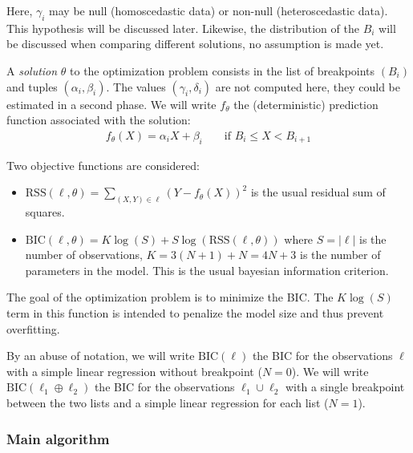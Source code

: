                 Here, \(\gamma_i\) may be null (homoscedastic data) or non-null (heteroscedastic data). This hypothesis
                will be discussed later. Likewise, the distribution of the \(B_i\) will be discussed when comparing
                different solutions, no assumption is made yet.

                A \emph{solution} \(\theta\) to the optimization problem consists in the list of breakpoints \((B_i)\)
                and tuples \((\alpha_i,\beta_i)\). The values \((\gamma_i, \delta_i)\) are not computed here, they could
                be estimated in a second phase. We will write \(f_\theta\) the (deterministic) prediction function
                associated with the solution:
                \begin{align}
                    f_{\theta}(X) = \alpha_i X + \beta_i
                        && \text{ if } B_i \leq X < B_{i+1}
                \end{align}

                Two objective functions are considered:
                \begin{itemize}
                    \item \(\text{RSS}(\ell, \theta) = \sum_{(X,Y)\in\ell} (Y-f_\theta(X))^2\) is the usual residual sum
                        of squares.
                    \item \(\text{BIC}(\ell, \theta) = K\log(S) + S\log(\text{RSS}(\ell, \theta))\) where \(S=|\ell|\)
                        is the number of observations, \(K = 3(N+1)+N = 4N+3\) is the number of parameters in the
                        model. This is the usual bayesian information criterion.
                \end{itemize}

                The goal of the optimization problem is to minimize the BIC. The \(K\log(S)\) term in this function is
                intended to penalize the model size and thus prevent overfitting.

                By an abuse of notation, we will write \(\text{BIC}(\ell)\) the BIC for the observations \(\ell\) with a
                simple linear regression without breakpoint (\ie \(N=0\)). We will write
                \(\text{BIC}(\ell_1\oplus\ell_2)\) the BIC for the observations \(\ell_1 \cup \ell_2\) with a single
                breakpoint between the two lists and a simple linear regression for each list (\ie \(N=1\)).

            \subsubsection{Main algorithm}%

